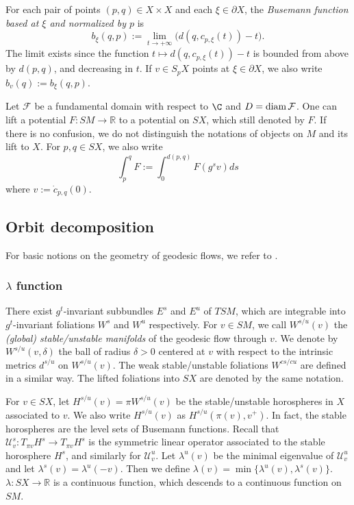 \documentclass[11pt]{amsart}
\theoremstyle{definition}
\newcommand{\UUU}{\mathcal{U}}
\newcommand{\F}{\mathcal{F}}
\def\pX{{\partial X}}
\def\RR{{\mathbb R}}
\def\diam{\mathop{\hbox{{\rm diam}}}}
\def\diam{\mathop{\hbox{{\rm diam}}}}
\def\l{\lambda}   \def\L{\Lambda}
\begin{document}
For each pair of points $(p,q)\in X \times X$ and each $\xi \in \pX$, the \emph{Busemann function based at $\xi$ and normalized by $p$} is
$$b_{\xi}(q,p):=\lim_{t\rightarrow +\infty}\big(d(q,c_{p,\xi}(t))-t\big).$$
The limit exists since the function $t \mapsto d(q,c_{p,\xi}(t))-t$ is bounded from above by $d(p,q)$, and decreasing in $t$. If $v\in S_pX$ points at $\xi\in \pX$, we also write $b_v(q):=b_{\xi}(q,p).$

Let $\F$ be a fundamental domain with respect to $\C$ and $D=\diam \F$.  One can lift a potential $F:SM\to \RR$  to a potential on $SX$, which still denoted by $F$. If there is no confusion, we do not distinguish the notations of objects on $M$ and its lift to $X$. For $p,q\in SX$, we also write
$$\int_p^qF:=\int_0^{d(p,q)}F(g^sv)ds$$
where $v:=\dot c_{p,q}(0)$.

\subsection{Orbit decomposition}
For basic notions on the geometry of geodesic flows, we refer to \cite[Section 2.4]{BCFT}. 
\subsubsection{$\l$ function}
There exist $g^t$-invariant subbundles $E^s$ and $E^u$ of $TSM$, which are integrable into $g^t$-invariant foliations $W^s$ and $W^u$ respectively. For $v\in SM$, we call $W^{s/u}(v)$ the \textit{(global) stable/unstable manifolds} of the geodesic flow through $v$. We denote by $W^{s/u}(v,\delta)$ the ball of radius $\delta>0$ centered at $v$ with respect to the intrinsic metrics $d^{s/u}$ on $W^{s/u}(v)$.  
The weak stable/unstable foliations $W^{cs/cu}$ are defined in a similar way. The lifted foliations into $SX$ are denoted by the same notation.

For $v\in SX$, let $H^{s/u}(v)=\pi W^{s/u}(v)$ be the stable/unstable horospheres in $X$ associated to $v$. We also write $H^{s/u}(v)$ as $H^{s/u}(\pi(v),v^+)$. In fact, the stable horospheres are the level sets of Busemann functions. Recall that $\UUU_v^s: T_{\pi v}H^s\to  T_{\pi v}H^s$ is the symmetric linear operator associated to the stable horosphere $H^s$, and similarly for $\UUU_v^u$. Let $\lambda^u(v)$ be the minimal eigenvalue of $\UUU_v^u$ and let $\lambda^s(v)=\lambda^u(-v)$. Then we define $\lambda(v)=\min \{\lambda^u(v), \lambda^s(v)\}.$ $\l: SX\to \RR$ is a continuous function, which descends to a continuous function on $SM$. 
\end{document}
